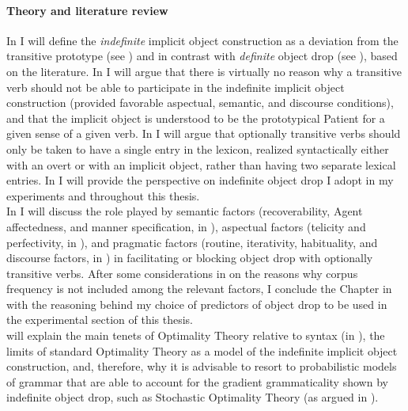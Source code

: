 \paragraph{Theory and literature review}
In  I will define the \textit{indefinite} implicit object construction as a deviation from the transitive prototype (see ) and in contrast with \textit{definite} object drop (see ), based on the literature. In  I will argue that there is virtually no reason why a transitive verb should not be able to participate in the indefinite implicit object construction (provided favorable aspectual, semantic, and discourse conditions), and that the implicit object is understood to be the prototypical Patient for a given sense of a given verb. In  I will argue that optionally transitive verbs should only be taken to have a single entry in the lexicon, realized syntactically either with an overt or with an implicit object, rather than having two separate lexical entries. In  I will provide the perspective on indefinite object drop I adopt in my experiments and throughout this thesis.\\
In  I will discuss the role played by semantic factors (recoverability, Agent affectedness, and manner specification, in ), aspectual factors (telicity and perfectivity, in ), and pragmatic factors (routine, iterativity, habituality, and discourse factors, in ) in facilitating or blocking object drop with optionally transitive verbs. After some considerations in  on the reasons why corpus frequency is not included among the relevant factors, I conclude the Chapter in  with the reasoning behind my choice of predictors of object drop to be used in the experimental section of this thesis.\\
 will explain the main tenets of Optimality Theory relative to syntax (in ), the limits of standard Optimality Theory as a model of the indefinite implicit object construction, and, therefore, why it is advisable to resort to probabilistic models of grammar that are able to account for the gradient grammaticality shown by indefinite object drop, such as Stochastic Optimality Theory (as argued in ).\\
